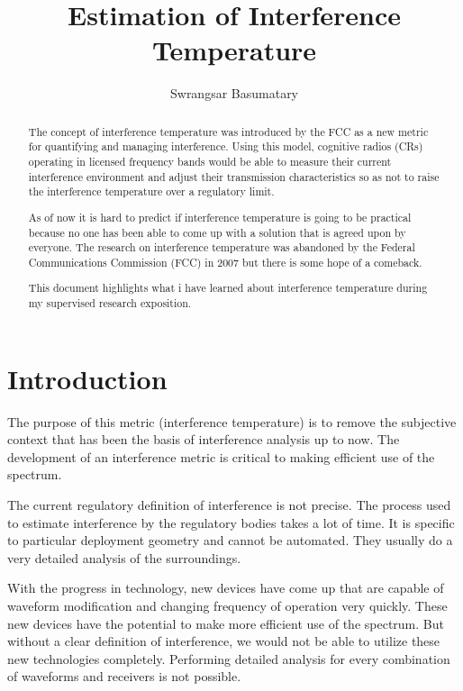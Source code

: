 \documentclass[12pt]{article}
\title{Estimation of Interference Temperature}
\author{Swrangsar Basumatary}
\begin{document}
\maketitle

\begin{abstract}

The concept of interference temperature was introduced by the FCC as a new metric for quantifying and managing interference. Using this model, cognitive radios (CRs) operating in licensed frequency bands would be able to measure their current interference environment and adjust their transmission characteristics so as not to raise the interference temperature over a regulatory limit.

As of now it is hard to predict if interference temperature is going to be practical because no one has been able to come up with a solution that is agreed upon by everyone. The research on interference temperature was abandoned by the Federal Communications Commission (FCC) in 2007 but there is some hope of a comeback.

This document highlights what i have learned about interference temperature during my supervised research exposition.

\end{abstract}

\section{Introduction}

The purpose of this metric (interference temperature) is to remove the subjective context that has been the basis of interference analysis up to now\cite{kolodzy2006}. The development of an interference metric is critical to making efficient use of the spectrum.

The current regulatory definition of interference is not precise. The process used to estimate interference by the regulatory bodies takes a lot of time. It is specific to particular deployment geometry and cannot be automated. They usually do a very detailed analysis of the surroundings.

With the progress in technology, new devices have come up that are capable of waveform modification and changing frequency of operation very quickly. These new devices have the potential to make more efficient use of the spectrum. But without a clear definition of interference, we would not be able to utilize these new technologies completely. Performing detailed analysis for every combination of waveforms and receivers is not possible.
\end{document}
